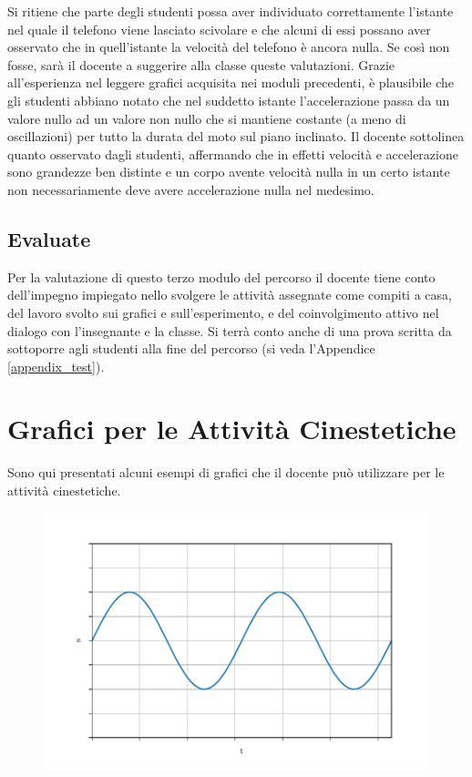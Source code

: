 \documentclass{report} \usepackage[T1]{fontenc} \usepackage[italian]{babel}
\begin{document}
Si ritiene che parte degli studenti possa aver individuato
correttamente l'istante nel quale il telefono viene lasciato
scivolare e  che alcuni di essi possano aver osservato che in quell'istante
la velocità del telefono è ancora nulla. Se così non fosse, sarà il
docente a suggerire alla classe queste valutazioni.
Grazie all'esperienza nel leggere grafici acquisita nei moduli precedenti,
è plausibile che gli studenti abbiano notato che nel suddetto istante
l'accelerazione passa da un valore nullo ad un valore non nullo che si
mantiene costante (a meno di oscillazioni) per tutto la durata
del moto sul piano inclinato.
Il docente sottolinea quanto osservato dagli studenti, affermando
che in effetti velocità e accelerazione sono grandezze ben distinte
e un corpo avente velocità nulla in un certo istante non necessariamente
deve avere accelerazione nulla nel medesimo.

\section{Evaluate}
Per la valutazione di questo terzo modulo del percorso il docente tiene conto
dell'impegno impiegato nello svolgere le attività assegnate come compiti a casa,
del lavoro svolto sui grafici e sull'esperimento, e del coinvolgimento attivo
nel dialogo con l'insegnante e la classe.
Si terrà conto anche di una prova scritta da sottoporre agli
studenti alla fine del percorso
(si veda l'Appendice \ref{appendix_test}).

\appendix
\chapter{Grafici per le Attività Cinestetiche}\label{appendix_kine}
Sono qui presentati alcuni esempi di grafici che il docente può
utilizzare per le attività cinestetiche.

\begin{figure}[H]
\centering
  \includegraphics[width=\textwidth]{kine_plot4}
  \label{fig:kine_plot4}
\end{figure}
\end{document}
